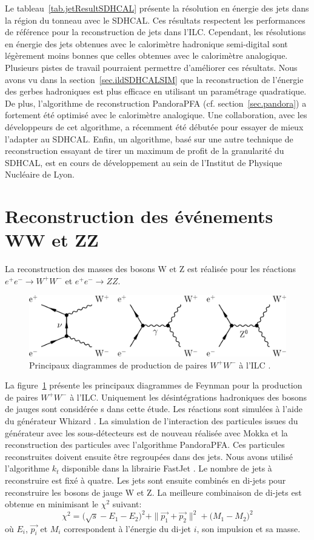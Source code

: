Le tableau~\ref{tab.jetResultSDHCAL} présente la résolution en énergie des jets dans la région du tonneau avec le SDHCAL. Ces résultats respectent les performances de référence pour la reconstruction de jets dans l'ILC. Cependant, les résolutions en énergie des jets obtenues avec le calorimètre hadronique semi-digital sont légèrement moins bonnes que celles obtenues avec le calorimètre analogique. Plusieurs pistes de travail pourraient permettre d'améliorer ces résultats. Nous avons vu dans la section~\ref{sec.ildSDHCALSIM} que la reconstruction de l'énergie des gerbes hadroniques est plus efficace en utilisant un paramétrage quadratique. De plus, l'algorithme de reconstruction PandoraPFA (cf. section~\ref{sec.pandora}) a fortement été optimisé avec le calorimètre analogique. Une collaboration, avec les développeurs de cet algorithme, a récemment été débutée pour essayer de mieux l'adapter au SDHCAL. Enfin, un algorithme, basé sur une autre technique de reconstruction essayant de tirer un maximum de profit de la granularité du SDHCAL, est en cours de développement au sein de l'Institut de Physique Nucléaire de Lyon.

\section{Reconstruction des événements WW et ZZ}
La reconstruction des masses des bosons W et Z est réalisée pour les réactions $e^+e^-\rightarrow W^+W^-$ et $e^+e^-\rightarrow ZZ$. 
\begin{figure}[!ht]
  \centering
  \includegraphics[width=.8\textwidth]{ILD/figs/wwFeynman.png}
  \caption{Principaux diagrammes de production de paires $W^+W^-$ à l'ILC \cite{physicsTDR}.}
  \label{fig:wwFeynman}
\end{figure}
La figure~\ref{fig:wwFeynman} présente les principaux diagrammes de Feynman pour la production de paires $W^+W^-$ à l'ILC. Uniquement les désintégrations hadroniques des bosons de jauges sont considérée s dans cette étude. Les réactions sont simulées à l'aide du générateur Whizard \cite{whizard}. La simulation de l'interaction des particules issues du générateur avec les sous-détecteurs est de nouveau réalisée avec Mokka et la reconstruction des particules avec l'algorithme PandoraPFA. Ces particules reconstruites doivent ensuite être regroupées dans des jets. Nous avons utilisé l'algorithme $k_t$ disponible dans la librairie FastJet \cite{fastJet}. Le nombre de jets à reconstruire est fixé à quatre. Les jets sont ensuite combinés en di-jets pour reconstruire les bosons de jauge W et Z. La meilleure combinaison de di-jets est obtenue en minimisant le $\chi^2$ suivant:
\begin{equation}
  \chi^2= \big( \sqrt{s}-E_1-E_2 \big)^2 + \|\vec{p_{1}}+\vec{p_2}\|^2 + \big(M_1-M_2\big)^2
\end{equation}
où $E_i$, $\vec{p_i}$ et $M_i$ correspondent à l'énergie du di-jet $i$, son impulsion et sa masse. 

